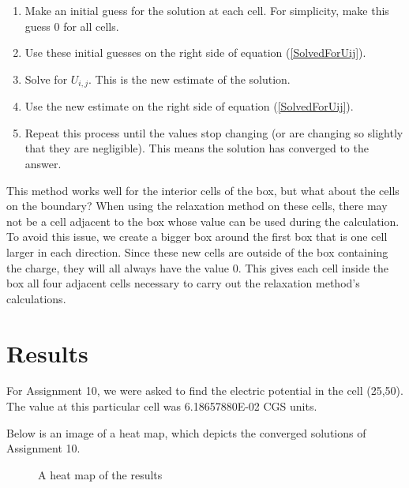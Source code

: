 \documentclass[12pt]{article}
\begin{document}
\begin{enumerate}
\item Make an initial guess for the solution at each cell. For simplicity, make
      this guess 0 for all cells.
\item Use these initial guesses on the right side of equation
      (\ref{SolvedForUij}).
\item Solve for $U_{i,j}$. This is the new estimate of the solution.
\item Use the new estimate on the right side of equation (\ref{SolvedForUij}).
\item Repeat this process until the values stop changing (or are changing so
      slightly that they are negligible). This means the solution has converged
      to the answer.
\end{enumerate}

This method works well for the interior cells of the box, but what about the
cells on the boundary? When using the relaxation method on these cells, there
may not be a cell adjacent to the box whose value can be used during the
calculation. To avoid this issue, we create a bigger box around the first
box that is one cell larger in each direction. Since these new cells are
outside of the box containing the charge, they will all always have the value 0.
This gives each cell inside the box all four adjacent cells necessary to carry
out the relaxation method's calculations.

\section{Results}
For Assignment 10, we were asked to find the electric potential in the cell
(25,50). The value at this particular cell was 6.18657880E-02 CGS units.

Below is an image of a heat map, which depicts the converged solutions of
Assignment 10.

\begin{figure}[ht]
\caption{A heat map of the results}
\end{figure}
\end{document}
